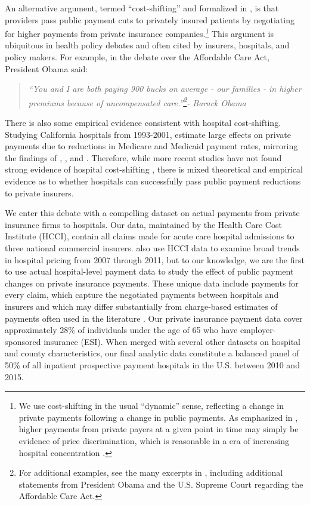 \documentclass[12pt]{article}
\begin{document}
An alternative argument, termed ``cost-shifting'' and formalized in \cite{dranove1988}, is that providers pass public payment cuts to privately insured patients by negotiating for higher payments from private insurance companies.\footnote{We use cost-shifting in the usual ``dynamic'' sense, reflecting a change in private payments following a change in public payments. As emphasized in \cite{hay1983}, higher payments from private payers at a given point in time may simply be evidence of price discrimination, which is reasonable in a era of increasing hospital concentration \citep{gaynor2015jel}.} This argument is ubiquitous in health policy debates and often cited by insurers, hospitals, and policy makers. For example, in the debate over the Affordable Care Act, President Obama said:
\begin{quote}
\textit{``You and I are both paying 900 bucks on average - our families - in higher premiums because of uncompensated care.''\footnote{For additional examples, see the many excerpts in \cite{dranove2017}, including additional statements from President Obama and the U.S. Supreme Court regarding the Affordable Care Act.}- Barack Obama}
\end{quote}
There is also some empirical evidence consistent with hospital cost-shifting. Studying California hospitals from 1993-2001, \cite{zwanziger2006} estimate large effects on private payments due to reductions in Medicare and Medicaid payment rates, mirroring the findings of \cite{lee2003}, \cite{zwanziger2000}, and \cite{cutler1998costshift}.  Therefore, while more recent studies have not found strong evidence of hospital cost-shifting \citep{frakt2011}, there is mixed theoretical and empirical evidence as to whether hospitals can successfully pass public payment reductions to private insurers.

We enter this debate with a compelling dataset on actual payments from private insurance firms to hospitals.  Our data, maintained by the Health Care Cost Institute (HCCI), contain all claims made for acute care hospital admissions to three national commercial insurers. \cite{cooper2015} also use HCCI data to examine broad trends in hospital pricing from 2007 through 2011, but to our knowledge, we are the first to use actual hospital-level payment data to study the effect of public payment changes on private insurance payments. These unique data include payments for every claim, which capture the negotiated payments between hospitals and insurers and which may differ substantially from charge-based estimates of payments often used in the literature \citep{dafny2009,dranove2017}. Our private insurance payment data cover approximately 28\% of individuals under the age of 65 who have employer-sponsored insurance (ESI). When merged with several other datasets on hospital and county characteristics, our final analytic data constitute a balanced panel of 50\% of all inpatient prospective payment hospitals in the U.S. between 2010 and 2015.
\end{document}
